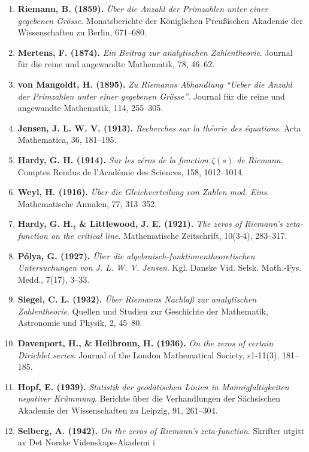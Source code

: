 \documentclass[
  11pt,
]{article}
\providecommand{\tightlist}{%
  \setlength{\itemsep}{0pt}\setlength{\parskip}{0pt}}
\begin{document}
\begin{enumerate}
\def\labelenumi{\arabic{enumi}.}
\tightlist
\item
  \textbf{Riemann, B. (1859).} \emph{Über die Anzahl der Primzahlen
  unter einer gegebenen Grösse}. Monatsberichte der Königlichen
  Preußischen Akademie der Wissenschaften zu Berlin, 671--680.
\item
  \textbf{Mertens, F. (1874).} \emph{Ein Beitrag zur analytischen
  Zahlentheorie}. Journal für die reine und angewandte Mathematik, 78,
  46--62.
\item
  \textbf{von Mangoldt, H. (1895).} \emph{Zu Riemanns Abhandlung ``Ueber
  die Anzahl der Primzahlen unter einer gegebenen Grösse''}. Journal für
  die reine und angewandte Mathematik, 114, 255--305.
\item
  \textbf{Jensen, J. L. W. V. (1913).} \emph{Recherches sur la théorie
  des équations}. Acta Mathematica, 36, 181--195.
\item
  \textbf{Hardy, G. H. (1914).} \emph{Sur les zéros de la fonction
  \(\zeta(s)\) de Riemann}. Comptes Rendus de l'Académie des Sciences,
  158, 1012--1014.
\item
  \textbf{Weyl, H. (1916).} \emph{Über die Gleichverteilung von Zahlen
  mod. Eins}. Mathematische Annalen, 77, 313--352.
\item
  \textbf{Hardy, G. H., \& Littlewood, J. E. (1921).} \emph{The zeros of
  Riemann's zeta-function on the critical line}. Mathematische
  Zeitschrift, 10(3-4), 283--317.
\item
  \textbf{Pólya, G. (1927).} \emph{Über die
  algebraisch-funktionentheoretischen Untersuchungen von J. L. W. V.
  Jensen}. Kgl. Danske Vid. Selsk. Math.-Fys. Medd., 7(17), 3--33.
\item
  \textbf{Siegel, C. L. (1932).} \emph{Über Riemanns Nachlaß zur
  analytischen Zahlentheorie}. Quellen und Studien zur Geschichte der
  Mathematik, Astronomie und Physik, 2, 45--80.
\item
  \textbf{Davenport, H., \& Heilbronn, H. (1936).} \emph{On the zeros of
  certain Dirichlet series}. Journal of the London Mathematical Society,
  s1-11(3), 181--185.
\item
  \textbf{Hopf, E. (1939).} \emph{Statistik der geodätischen Linien in
  Mannigfaltigkeiten negativer Krümmung}. Berichte über die
  Verhandlungen der Sächsischen Akademie der Wissenschaften zu Leipzig,
  91, 261--304.
\item
  \textbf{Selberg, A. (1942).} \emph{On the zeros of Riemann's
  zeta-function}. Skrifter utgitt av Det Norske Videnskaps-Akademi i

\end{enumerate}
\end{document}

